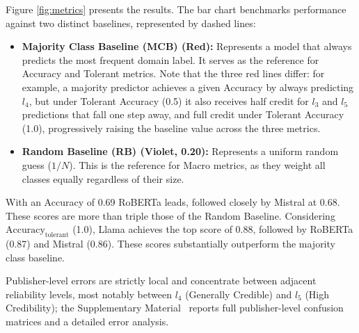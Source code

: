 \documentclass[journal]{IEEEtran}
\begin{document}
Figure \ref{fig:metrics} presents the results. The bar chart benchmarks performance against two distinct baselines, represented by dashed lines:
\begin{itemize}
    \item \textbf{Majority Class Baseline (MCB) (Red):} Represents a model that always predicts the most frequent domain label. It serves as the reference for Accuracy and Tolerant metrics. Note that the three red lines differ: for example, a majority predictor achieves a given Accuracy by always predicting $l_4$, but under Tolerant Accuracy (0.5) it also receives half credit for $l_3$ and $l_5$ predictions that fall one step away, and full credit under Tolerant Accuracy (1.0), progressively raising the baseline value across the three metrics.
    \item \textbf{Random Baseline (RB) (Violet, 0.20):} Represents a uniform random guess ($1/N$). This is the reference for Macro metrics, as they weight all classes equally regardless of their size.

\end{itemize}

With an Accuracy of 0.69 RoBERTa leads, followed closely by Mistral at 0.68. These scores are more than triple those of the Random Baseline. 
Considering $\mathrm{Accuracy}_{\mathrm{tolerant}}$  (1.0), Llama achieves the top score of 0.88, followed by RoBERTa (0.87) and Mistral (0.86). These scores substantially outperform the majority class baseline.

Publisher-level errors are strictly local and concentrate between adjacent reliability levels, most notably between $l_4$ (Generally Credible) and $l_5$ (High Credibility); the Supplementary Material~\cite{bianchi2026supplementary} reports full publisher-level confusion matrices and a detailed error analysis.






\end{document}
